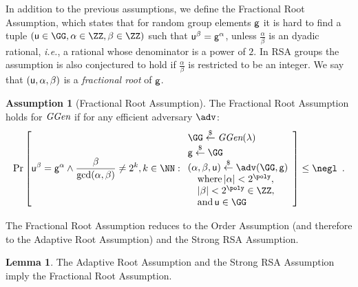 \documentclass{article}
\theoremstyle{definition}
\newtheorem{lemma}{Lemma}
\newtheorem{assumption}{Assumption}
\begin{document}
	
In addition to the previous assumptions, we define the Fractional Root Assumption, which states that for random group elements $\mathsf{g}$ it is hard to find a tuple $(\gr{u}\in \GG,\alpha\in \ZZ,\beta\in \ZZ)$ such that $\mathsf{u}^{\beta}=\mathsf{g}^{\alpha}$, unless $\frac{\alpha}{\beta}$ is an dyadic rational, \emph{i.e.}, a rational whose denominator is a power of $2$. In RSA groups the assumption is also conjectured to hold if $\frac{\alpha}{\beta}$ is restricted to be an integer. We say that $(\mathsf{u},\alpha,\beta)$ is a \emph{fractional root} of $\mathsf{g}$.

\begin{assumption}[Fractional Root Assumption]
\label{assum:fracroot}
The Fractional Root Assumption holds for $\textit{GGen}$ if for any efficient adversary $\adv$:
\[        
                \Pr\left[\gr{u}^\beta = \gr{g}^{\alpha} \wedge \frac{\beta}{\gcd(\alpha,\beta)}\neq 2^k,  k \in \NN   : 
                \begin{array}{l} 
                      \GG \sample \ggen(\lambda) \\ 
                      \gr{g} \sample \GG \\
                      (\alpha, \beta, \gr{u}) \sample \adv(\GG, \gr{g}) \\
                      \quad \textnormal{where} \, |\alpha|<2^{\poly}, \\
                      \quad |\beta|<2^{\poly} \in \ZZ, \\
                      \quad \textnormal{and} \, \gr{u} \in \GG 
                \end{array} 
        \right] \leq \negl \enspace .
\]
\end{assumption}
The Fractional Root Assumption reduces to the Order Assumption (and therefore to the Adaptive Root Assumption) and the Strong RSA Assumption.
\begin{lemma}
\label{lem:strongtofractional}
	The Adaptive Root Assumption and the Strong RSA Assumption imply the Fractional Root Assumption.
\end{lemma}
\end{document}

